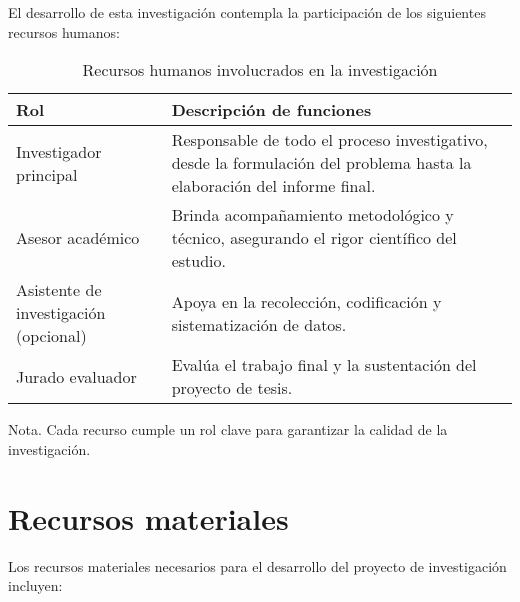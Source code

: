 El desarrollo de esta investigación contempla la participación de los siguientes recursos humanos:

\begin{table}[H]
\centering
\begin{threeparttable}
\caption{Recursos humanos involucrados en la investigación}
\label{tab:recursos_humanos}
\begin{tabular}{@{}p{4cm}p{9cm}@{}}
\toprule
\textbf{Rol} & \textbf{Descripción de funciones} \\
\midrule
Investigador principal & Responsable de todo el proceso investigativo, desde la formulación del problema hasta la elaboración del informe final. \\
Asesor académico & Brinda acompañamiento metodológico y técnico, asegurando el rigor científico del estudio. \\
Asistente de investigación (opcional) & Apoya en la recolección, codificación y sistematización de datos. \\
Jurado evaluador & Evalúa el trabajo final y la sustentación del proyecto de tesis. \\
\bottomrule
\end{tabular}
\begin{tablenotes}
\item Nota. Cada recurso cumple un rol clave para garantizar la calidad de la investigación.
\end{tablenotes}
\end{threeparttable}
\end{table}

\section{Recursos materiales}

Los recursos materiales necesarios para el desarrollo del proyecto de investigación incluyen:

